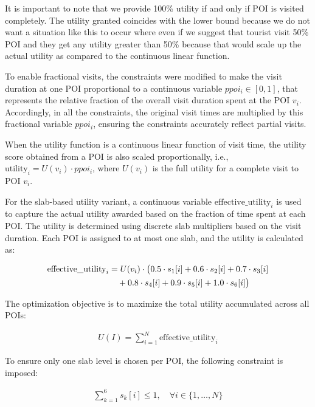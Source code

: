 {\begin{itemize}
It is important to note that we provide 100\% utility if and only if POI is visited completely. The utility granted coincides with the lower bound because we do not want a situation like this to occur where even if we suggest that tourist visit 50\% POI and they get any utility greater than 50\% because that would scale up the actual utility as compared to the continuous linear function.
\end{itemize}

To enable fractional visits, the constraints were modified to make the visit duration at one POI proportional to a continuous variable \( ppoi_i \in [0,1] \), that represents the relative fraction of the overall visit duration spent at the POI \( v_i \). Accordingly, in all the constraints, the original visit times are multiplied by this fractional variable \( ppoi_i \), ensuring the constraints accurately reflect partial visits.

When the utility function is a continuous linear function of visit time, the utility score obtained from a POI is also scaled proportionally, i.e., \( \text{utility}_i = U(v_i) \cdot ppoi_i \), where \( U(v_i) \) is the full utility for a complete visit to POI \( v_i \).

For the slab-based utility variant, a continuous variable \( \text{effective\_utility}_i \) is used to capture the actual utility awarded based on the fraction of time spent at each POI. The utility is determined using discrete slab multipliers based on the visit duration. Each POI is assigned to at most one slab, and the utility is calculated as:

\begin{align}
\label{effective_utility}
\text{effective\_utility}_i &= U(v_i) \cdot \big(0.5 \cdot s_1[i] + 0.6 \cdot s_2[i] + 0.7 \cdot s_3[i] \notag \\
&\quad + 0.8 \cdot s_4[i] + 0.9 \cdot s_5[i] + 1.0 \cdot s_6[i] \big)
\end{align}

The optimization objective is to maximize the total utility accumulated across all POIs:

\begin{align}
\label{objective_fun_slabs}
U(I) = \sum_{i=1}^N \text{effective\_utility}_i
\end{align}

To ensure only one slab level is chosen per POI, the following constraint is imposed:

\begin{align}
\sum_{k=1}^{6} s_k[i] \leq 1, \quad \forall i \in \{1, \dots, N\}
\end{align}

}

